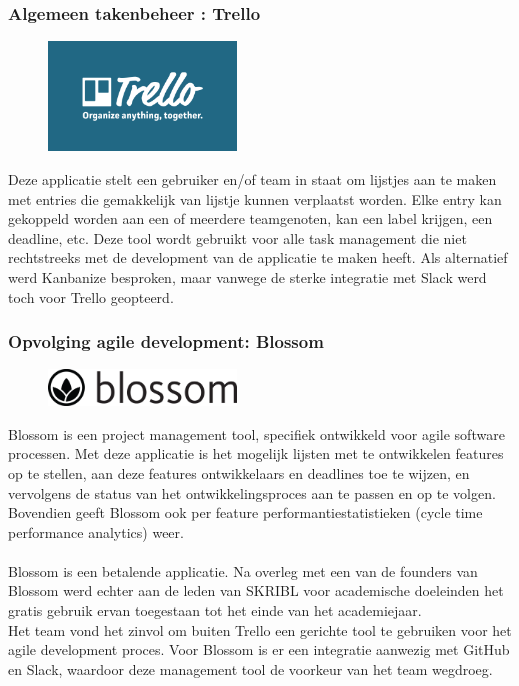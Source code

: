 \documentclass{article}
\begin{document}
\clearpage

\subsubsection*{Algemeen takenbeheer : Trello}

\begin{figure}[h!]
\centering
 \includegraphics[width=50mm]{trello_logo.png}
\end{figure}

\noindent Deze applicatie stelt een gebruiker en/of team in staat om lijstjes aan te maken met entries die gemakkelijk van lijstje kunnen verplaatst worden. Elke entry kan gekoppeld worden aan een of meerdere teamgenoten, kan een label krijgen, een deadline, etc. Deze tool wordt gebruikt voor alle task management die niet rechtstreeks met de development van de applicatie te maken heeft. 
\noindent Als alternatief werd Kanbanize besproken, maar vanwege de sterke integratie met Slack werd toch voor Trello geopteerd.


\subsubsection*{Opvolging agile development: Blossom}

\begin{figure}[h!]
\centering
 \includegraphics[width=50mm]{blossom.png}
\end{figure}

\noindent  Blossom is een project management tool, specifiek ontwikkeld voor agile software processen. Met deze applicatie is het mogelijk lijsten met te ontwikkelen features op te stellen, aan deze features ontwikkelaars en deadlines toe te wijzen, en vervolgens de status van het ontwikkelingsproces aan te passen en op te volgen. Bovendien geeft Blossom ook per feature performantiestatistieken (cycle time performance analytics) weer. \\
\\
Blossom is een betalende applicatie. Na overleg met een van de founders van Blossom werd echter aan de leden van SKRIBL  voor academische doeleinden het gratis gebruik ervan toegestaan tot het einde van het academiejaar.  \\
Het team vond het zinvol om buiten Trello een gerichte tool te gebruiken voor het agile development proces. Voor Blossom is er een integratie aanwezig met GitHub en Slack, waardoor deze management tool de voorkeur van het team wegdroeg. 
\end{document}
